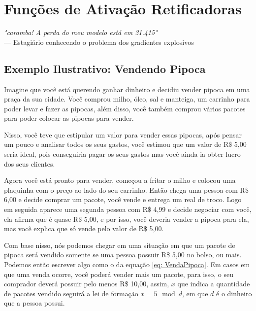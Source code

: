 
\chapter{Funções de Ativação Retificadoras}
\label{cap:ativacao-retificadoras}

\begin{flushright}
\textit{"caramba! A perda do meu modelo está em 31.415"} \\
--- Estagiário conhecendo o problema dos gradientes explosivos
\end{flushright}


\section{Exemplo Ilustrativo: Vendendo Pipoca}

Imagine que você está querendo ganhar dinheiro e decidiu vender pipoca em uma praça da sua cidade. Você comprou milho, óleo, sal e manteiga, um carrinho para poder levar e fazer as pipocas, além disso, você também comprou vários pacotes para poder colocar as pipocas para vender.

Nisso, você teve que estipular um valor para vender essas pipocas, após pensar um pouco e analisar todos os seus gastos, você estimou que um valor de R\$ 5,00 seria ideal, pois conseguiria pagar os seus gastos mas você ainda ia obter lucro dos seus clientes.

Agora você está pronto para vender, começou a fritar o milho e colocou uma plaquinha com o preço ao lado do seu carrinho. Então chega uma pessoa com R\$ 6,00 e decide comprar um pacote, você vende e entrega um real de troco. Logo em seguida aparece uma segunda pessoa com R\$ 4,99 e decide negociar com você, ela afirma que é quase R\$ 5,00, e por isso, você deveria vender a pipoca para ela, mas você explica que só vende pelo valor de R\$ 5,00.

Com base nisso, nós podemos chegar em uma situação em que um pacote de pipoca será vendido somente se uma pessoa possuir R\$ 5,00 no bolso, ou mais. Podemos então escrever algo como o da equação \ref{eq: VendaPipoca}. Em casos em que uma venda ocorre, você poderá vender mais um pacote, para isso, o seu comprador deverá possuir pelo menos R\$ 10,00, assim, $x$ que indica a quantidade de pacotes vendido seguirá a lei de formação $x = 5 \mod d$, em que $d$ é o dinheiro que a pessoa possui.

